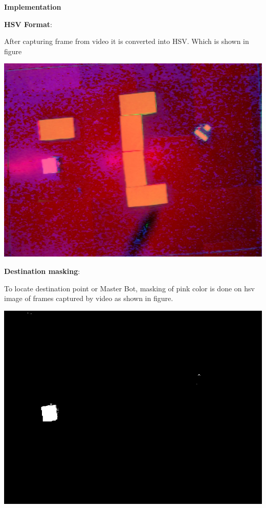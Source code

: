 \documentclass[report]{res}
\begin{document}
	\pagebreak	
	
	
	\begin{center}
		\textbf{\huge Implementation} \\
	\end{center}
	
	\textbf{HSV Format}:
	
	After capturing frame from video it is converted into HSV. Which is shown in figure
	
	\begin{center}
	\includegraphics[scale = 0.8]{graphics/case1/have_video.jpeg}\\
	\end{center}
	
	\pagebreak
	
	
	\textbf{Destination masking}:	
	
	To locate destination point or Master Bot, masking of pink color is done on hsv image of frames captured by video as shown in figure.
	
	\begin{center}
	\includegraphics[scale = 0.8]{graphics/case1/destination_mask.jpeg}\\
	\end{center}
	
\end{document}
